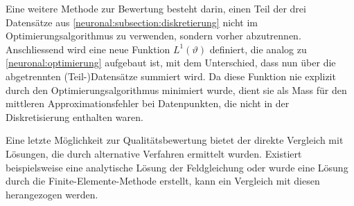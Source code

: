 Eine weitere Methode zur Bewertung besteht darin, einen Teil der drei Datensätze aus \ref{neuronal:subsection:diskretierung} nicht im Optimierungsalgorithmus zu verwenden, sondern vorher abzutrennen.
Anschliessend wird eine neue Funktion \( L^1(\vartheta) \) definiert, die analog zu \eqref{neuronal:optimierung} aufgebaut ist, mit dem Unterschied, dass nun über die abgetrennten (Teil-)Datensätze summiert wird.
Da diese Funktion nie explizit durch den Optimierungsalgorithmus minimiert wurde, dient sie als Mass für den mittleren Approximationsfehler bei Datenpunkten, die nicht in der Diskretisierung enthalten waren.

Eine letzte Möglichkeit zur Qualitätsbewertung bietet der direkte Vergleich mit Lösungen, die durch alternative Verfahren ermittelt wurden.
Existiert beispielsweise eine analytische Lösung der Feldgleichung oder wurde eine Lösung durch die Finite-Elemente-Methode erstellt, kann ein Vergleich mit diesen herangezogen werden.
